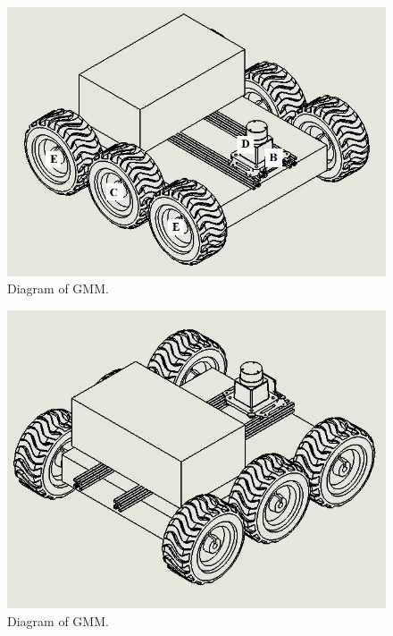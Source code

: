 \documentclass[letterpaper,12pt]{report}
\begin{document}
\begin{figure}[h]
	\centering
	\includegraphics[width=1\textwidth]{GMMlabel.jpg}
	\caption{Diagram of GMM.}
	\label{Figure 1:}
\end{figure}

\begin{figure}[h]
	\centering
	\includegraphics[width=1\textwidth]{gmmBehind.jpg}
	\caption{Diagram of GMM.}
	\label{Figure 1:}
\end{figure}
\end{document}

